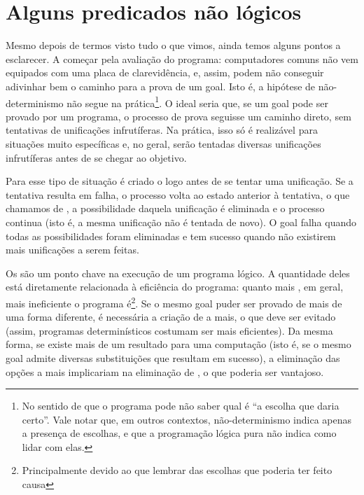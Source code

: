 
%

%

\section{Alguns predicados não lógicos}

Mesmo depois de termos visto tudo o que vimos, ainda temos alguns
pontos a esclarecer. A começar pela avaliação do programa:
computadores comuns não vem equipados com uma placa de clarevidência,
e, assim, podem não conseguir adivinhar bem o caminho para a prova de
um goal. Isto é, a hipótese de não-determinismo não segue na
prática\footnote{No sentido de que o programa pode não saber qual é
  ``a escolha que daria certo''. Vale notar que, em outros contextos,
  não-determinismo indica apenas a presença de escolhas, e que a
  programação lógica pura não indica como lidar com elas.}. O ideal
seria que, se um goal pode ser provado por um programa, o processo de
prova seguisse um caminho direto, sem tentativas de unificações
infrutíferas. Na prática, isso só é realizável para situações muito
específicas e, no geral, serão tentadas diversas unificações
infrutíferas antes de se chegar ao objetivo.

Para esse tipo de situação é criado o  logo
antes de se tentar uma unificação. Se a tentativa resulta em falha, o
processo volta ao estado anterior à tentativa, o que chamamos de
, a possibilidade daquela unificação é
eliminada e o processo continua (isto é, a mesma unificação não é
tentada de novo). O goal falha quando todas as possibilidades foram
eliminadas e tem sucesso quando não existirem mais unificações a serem
feitas.

Os  são um ponto chave na execução de um
programa lógico. A quantidade deles está diretamente relacionada à
eficiência do programa: quanto mais , em geral,
mais ineficiente o programa é\footnote{Principalmente devido ao
   que lembrar das escolhas que poderia ter feito
  causa}. Se o mesmo goal puder ser
provado de mais de uma forma diferente, é necessária a criação de
 a mais, o que deve ser evitado (assim,
programas determinísticos costumam ser mais eficientes). Da
mesma forma, se existe mais de um resultado para uma computação (isto
é, se o mesmo goal admite diversas substituições que resultam em
sucesso), a eliminação das opções a mais implicariam na eliminação de
, o que poderia ser vantajoso.

